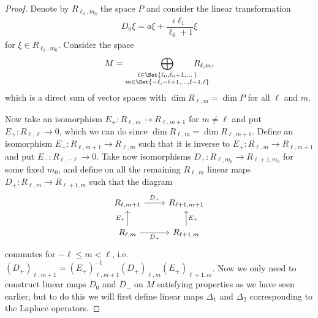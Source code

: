 \begin{proof}
  Denote by $R_{\ell_0,m_0}$ the space $P$ and consider the linear transformation
  \begin{align*}
    D_0 \xi = a\xi + \dfrac{i\ell_1}{\ell_0+1}\xi
  \end{align*}
  for $\xi\in R_{\ell_0,m_0}$. Consider the space
  \begin{align*}
    M = \bigoplus_{\substack{\ell\in\Set{\ell_0,\ell_0+1,\dotsc} \\ m\in\Set{-\ell,-\ell+1,\dotsc,\ell-1,\ell}}} \!\!\!\!\!\!\!\!\!\!\!\! R_{\ell,m},
  \end{align*}
  which is a direct sum of vector spaces with $\dim R_{\ell,m} = \dim P$ for all $\ell$ and $m$.

  Now take an isomorphism $E_+\colon R_{\ell,m}\to R_{\ell,m+1}$ for $m\neq \ell$ and put $E_+\colon R_{\ell,\ell}\to 0$, which we can do since $\dim R_{\ell,m}=\dim R_{\ell,m+1}$. Define an isomorphism $E_-\colon R_{\ell,m+1}\to R_{\ell,m}$ such that it is inverse to $E_+\colon R_{\ell,m}\to R_{\ell,m+1}$ and put $E_-\colon R_{\ell,-\ell}\to 0$. Take now isomorphisms $D_+\colon R_{\ell,m_0}\to R_{\ell+1,m_0}$ for some fixed $m_0$, and define on all the remaining $R_{\ell,m}$ linear maps $D_+\colon R_{\ell,m}\to R_{\ell+1,m}$ such that the diagram
  \[
    \begin{tikzcd}
      R_{\ell,m+1} \ar[r,"D_+"] & R_{\ell+1,m+1} \\
      R_{\ell,m}\ar[u,"E_+"] \ar[r,"D_+",swap] & R_{\ell+1,m}\ar[u,"E_+",swap]
    \end{tikzcd}
  \]
  commutes for $-\ell\leq m<\ell$, i.e.\ $(D_+)_{\ell,m+1}=(E_+)_{\ell,m+1}^{-1} (D_+)_{\ell,m} (E_+)_{\ell+1,m}$. Now we only need to construct linear maps $D_0$ and $D_-$ on $M$ satisfying properties as we have seen earlier, but to do this we will first define linear maps $\Delta_1$ and $\Delta_2$ corresponding to the Laplace operators.


\end{proof}
